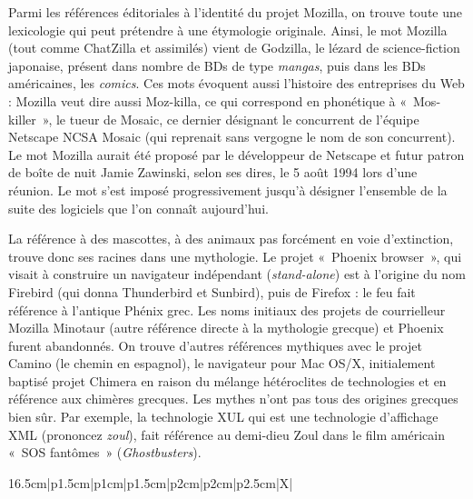 \documentclass{FramateX}
\begin{document}
\begin{refsection}
Parmi les références éditoriales à l'identité du projet Mozilla, on
trouve toute une lexicologie qui peut prétendre à une étymologie
originale. Ainsi, le mot Mozilla (tout comme ChatZilla et assimilés)
vient de Godzilla, le lézard de science-fiction japonaise, présent dans
nombre de BDs de type \textit{mangas}, puis dans les BDs américaines, les
\textit{comics}. Ces mots évoquent aussi l'histoire des entreprises du
Web : Mozilla veut dire aussi Moz-killa, ce qui correspond en
phonétique à «~Mos-killer~», le tueur de Mosaic, ce dernier désignant
le concurrent de l'équipe Netscape NCSA Mosaic (qui reprenait sans
vergogne le nom de son concurrent). Le mot Mozilla aurait été proposé
par le développeur de Netscape et futur patron de boîte de nuit Jamie
Zawinski, selon ses dires, le 5 août 1994 lors d'une réunion. Le mot
s'est imposé progressivement jusqu'à désigner l'ensemble de la suite
des logiciels que l'on connaît aujourd'hui. 

La référence à des mascottes, à des animaux pas forcément en voie
d'extinction, trouve donc ses racines dans une mythologie. Le projet
«~Phoenix browser~», qui visait à construire un navigateur indépendant
(\textit{stand-alone}) est à l'origine du nom Firebird (qui donna
Thunderbird et Sunbird), puis de Firefox : le feu fait référence à
l'antique Phénix grec. Les noms initiaux des projets de courrielleur
Mozilla Minotaur (autre référence directe à la mythologie grecque) et
Phoenix furent abandonnés. On trouve d'autres références mythiques avec
le projet Camino (le chemin en espagnol), le navigateur pour Mac OS/X,
initialement baptisé projet Chimera en raison du mélange hétéroclites
de technologies et en référence aux chimères grecques. Les mythes n'ont
pas tous des origines grecques bien sûr. Par exemple, la technologie
XUL qui est une technologie d'affichage XML (prononcez \textit{zoul}),
fait référence au demi-dieu Zoul dans le film américain «~SOS
fantômes~» (\textit{Ghostbusters}). 



\begin{landscape}

\begin{table}
\centering
\begin{scriptsize}

\begin{tabularx}{16.5cm}{{|p{1.5cm}|p{1cm}|p{1.5cm}|p{2cm}|p{2cm}|p{2.5cm}|X|}}


\end{tabularx}
\end{scriptsize}
\end{table}
\end{landscape}
\end{refsection}
\end{document}
